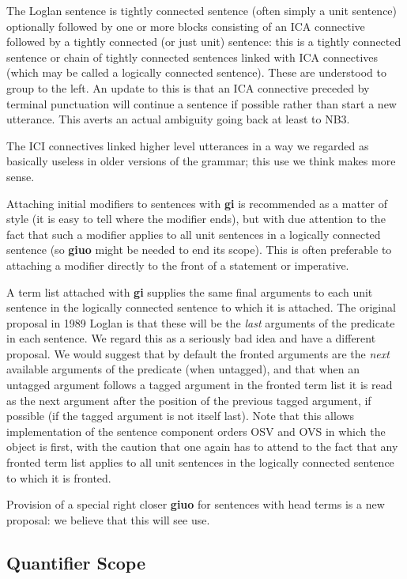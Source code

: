 \documentclass[12pt]{book}
\begin{document}
{The Loglan sentence is  tightly connected sentence (often simply a unit sentence) optionally followed by one or more blocks consisting of an  ICA connective followed by a tightly connected (or just unit) sentence:  this is a tightly connected sentence or chain of tightly connected sentences linked with ICA connectives (which may be called a logically connected sentence).  These are understood to group to the left.   An update to this is that an ICA connective preceded by terminal punctuation will continue a sentence if possible rather than start a new utterance.  This averts an actual ambiguity going back at least to NB3.

The ICI connectives linked higher level utterances in a way we regarded as basically useless in older versions of the grammar;  this use we think makes more sense.

Attaching initial modifiers to sentences with {\bf gi} is recommended as a matter of style (it is easy to tell where the modifier ends), but with due attention to the fact that such a modifier applies to all unit sentences in a logically connected sentence (so {\bf giuo} might be needed to end its scope).  This is often preferable to attaching a modifier directly to the front of a statement or imperative.

A term list attached with {\bf gi} supplies the same final arguments to each unit sentence in the logically connected sentence to which it is attached.  The original proposal in 1989 Loglan is that these will be the {\em last\/} arguments of the predicate in each sentence.  We regard this as a seriously bad idea and have a different proposal.  We would suggest that by default the fronted arguments are the {\em next\/} available arguments of the predicate (when untagged), and that when an untagged argument follows a tagged argument in the fronted term list it is read as the next argument after the position of the previous tagged argument, if possible (if the tagged argument is not itself last).  Note that this allows implementation of the sentence component orders OSV and OVS in which the object is first, with the caution that one again has to attend to the fact that any fronted term list applies to all unit sentences in the logically connected sentence to which it is fronted.

Provision of a special right closer {\bf giuo} for sentences with head terms is a new proposal:  we believe that this will see use.

\subsection{Quantifier Scope}

}
\end{document}
